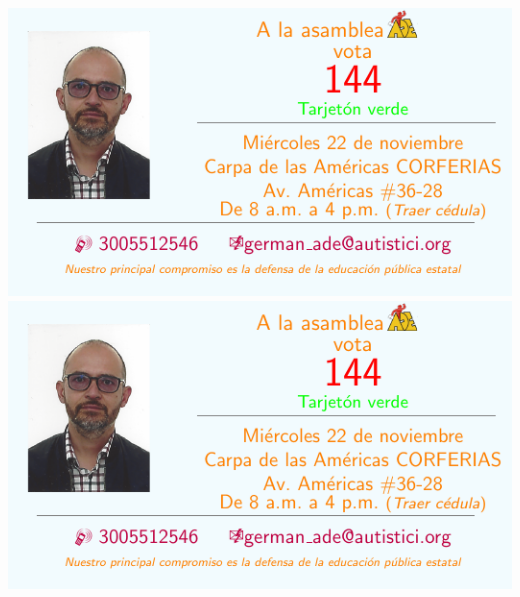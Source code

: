 \documentclass[10pt,letterpaper]{minimal}
\begin{document}
\thispagestyle{empty}
\noindent

\begin{center}
\hspace{1mm}\includegraphics[scale=1]{Tarjeta.pdf} \includegraphics[scale=1]{Tarjeta.pdf} \vspace{1mm}


\end{center}
\end{document}
